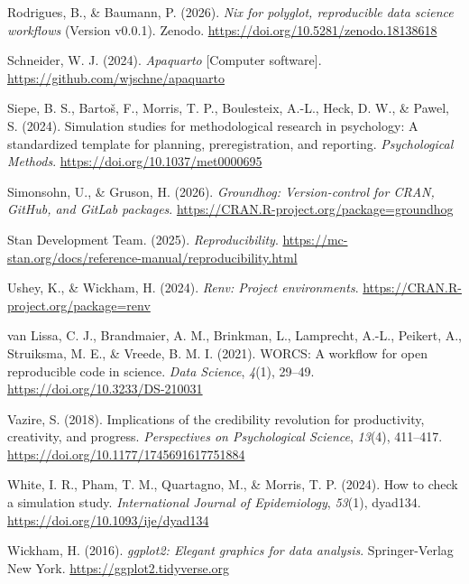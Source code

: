 \documentclass[
  man,
  longtable,
  nolmodern,
  notxfonts,
  notimes,
  colorlinks=true,linkcolor=blue,citecolor=blue,urlcolor=blue]{apa7}
\newlength{\cslhangindent}
\newenvironment{CSLReferences}[2] %
 {\begin{list}{}{%
  \setlength{\itemindent}{0pt}
  \setlength{\leftmargin}{0pt}
  \setlength{\parsep}{0pt}
  \ifodd #1
   \setlength{\leftmargin}{\cslhangindent}
   \setlength{\itemindent}{-1\cslhangindent}
  \fi
  \setlength{\itemsep}{#2\baselineskip}}}
 {\end{list}}
\begin{document}
\begin{CSLReferences}{1}{0}
Rodrigues, B., \& Baumann, P. (2026). \emph{Nix for polyglot,
reproducible data science workflows} (Version v0.0.1). Zenodo.
\url{https://doi.org/10.5281/zenodo.18138618}

Schneider, W. J. (2024). \emph{{Apaquarto}} {[}Computer software{]}.
\url{https://github.com/wjschne/apaquarto}

Siepe, B. S., Bartoš, F., Morris, T. P., Boulesteix, A.-L., Heck, D. W.,
\& Pawel, S. (2024). Simulation studies for methodological research in
psychology: A standardized template for planning, preregistration, and
reporting. \emph{Psychological Methods}.
\url{https://doi.org/10.1037/met0000695}

Simonsohn, U., \& Gruson, H. (2026). \emph{Groundhog: Version-control
for CRAN, GitHub, and GitLab packages}.
\url{https://CRAN.R-project.org/package=groundhog}

Stan Development Team. (2025). \emph{Reproducibility}.
\url{https://mc-stan.org/docs/reference-manual/reproducibility.html}

Ushey, K., \& Wickham, H. (2024). \emph{Renv: Project environments}.
\url{https://CRAN.R-project.org/package=renv}

van Lissa, C. J., Brandmaier, A. M., Brinkman, L., Lamprecht, A.-L.,
Peikert, A., Struiksma, M. E., \& Vreede, B. M. I. (2021). {WORCS}: A
workflow for open reproducible code in science. \emph{Data Science},
\emph{4}(1), 29--49. \url{https://doi.org/10.3233/DS-210031}

Vazire, S. (2018). Implications of the credibility revolution for
productivity, creativity, and progress. \emph{Perspectives on
Psychological Science}, \emph{13}(4), 411--417.
\url{https://doi.org/10.1177/1745691617751884}

White, I. R., Pham, T. M., Quartagno, M., \& Morris, T. P. (2024). How
to check a simulation study. \emph{International Journal of
Epidemiology}, \emph{53}(1), dyad134.
\url{https://doi.org/10.1093/ije/dyad134}

Wickham, H. (2016). \emph{ggplot2: Elegant graphics for data analysis}.
Springer-Verlag New York. \url{https://ggplot2.tidyverse.org}


\end{CSLReferences}
\end{document}
